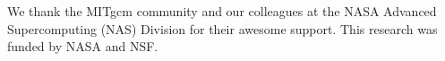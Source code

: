 \documentclass[grl]{agutex2015}
\begin{document}
\begin{article}
\begin{acknowledgments}
We thank the MITgcm community and our colleagues at the NASA Advanced
Supercomputing (NAS) Division for their awesome support.
This research was funded by NASA and NSF.
\end{acknowledgments}

%
%
%
%
%
%
%
%
%





%
%
%
%


\end{article}
\end{document}
